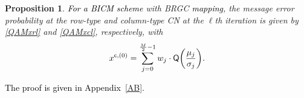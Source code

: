 \documentclass[journal]{IEEEtran}
\newtheorem{proposition}{Proposition}
\newcommand{\mep}{{x}}
\newcommand{\col}{\mathsf{c}}
\newcommand{\Q}{\mathsf{Q}}
\newcommand{\SH}{\textcolor{black}}
\newcommand{\GL}{\textcolor{black}}
\newcommand{\GLC}[1]{\textcolor{black}{\textbf{\textit{#1}}}}
\let\originalleft\left
\let\originalright\right
\renewcommand{\left}{\mathopen{}\mathclose\bgroup\originalleft}
\renewcommand{\right}{\aftergroup\egroup\originalright}
\begin{document}
\medskip

\begin{proposition}
\GL{For a BICM scheme} with BRGC \SH{mapping}, the message error probability at the row-type and column-type CN at the $\ell$th iteration is given by \eqref{QAMxrl} and \eqref{QAMxcl}, respectively, with 
\[
\mep^{\col,(0)}=\sum\limits_{j = 0}^{\frac{M}{2} - 1} {{w_j}}\cdot\Q\left(\frac{\mu_j}{\sigma_j}\right).
\]
\end{proposition}
\GL{The proof is given in Appendix~\ref{AB}.}	







\end{document}
